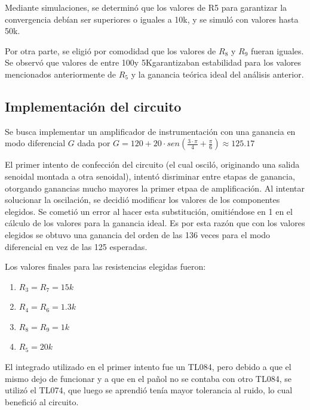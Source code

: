\documentclass[../../tc_tp3_main.tex]{subfiles}
\begin{document}
Mediante simulaciones, se determinó que los valores de R5 para garantizar la convergencia debían ser superiores o iguales a 10k\ohm, y se simuló con valores hasta 50k\ohm.\par
Por otra parte, se eligió por comodidad que los valores de $R_8$ y $R_9$ fueran iguales. Se observó que valores de entre 100\ohm y 5K\ohm garantizaban estabilidad para los valores mencionados anteriormente de $R_5$ y la ganancia teórica ideal del análisis anterior.\par


\subsection{Implementación del circuito}

Se busca implementar un amplificador de instrumentación con una ganancia en modo diferencial $G$ dada por 
$G = 120 + 20\cdot sen(\frac{3\cdot\pi}{4}+\frac{\pi}{6}) \approx 125.17$\par

El primer intento de confección del circuito (el cual osciló, originando una salida senoidal montada a otra senoidal), intentó disriminar entre etapas de ganancia, otorgando ganancias mucho mayores la primer etpaa de amplificación. Al intentar solucionar la oscilación, se decidió modificar los valores de los componentes elegidos. Se cometió un error al hacer esta substitución, omitiéndose en 1 en el cálculo de los valores para la ganancia ideal. Es por esta razón que con los valores elegidos se obtuvo una ganancia del orden de las 136 veces para el modo diferencial en vez de las 125 esperadas. \par

Los valores finales para las resistencias elegidas fueron:\par

\begin{enumerate}
	\item $R_3 = R_7 = 15k$
	\item $R_4 = R_6 = 1.3k$
	\item $R_8 = R_9 = 1k$
	\item $R_5 = 20k$ 
\end{enumerate}

El integrado utilizado en el primer intento fue un TL084, pero debido a que el mismo dejo de funcionar y a que en el pañol no se contaba con otro TL084, se utilizó el TL074, que luego se aprendió tenía mayor tolerancia al ruido, lo cual benefició al circuito.
\end{document}
